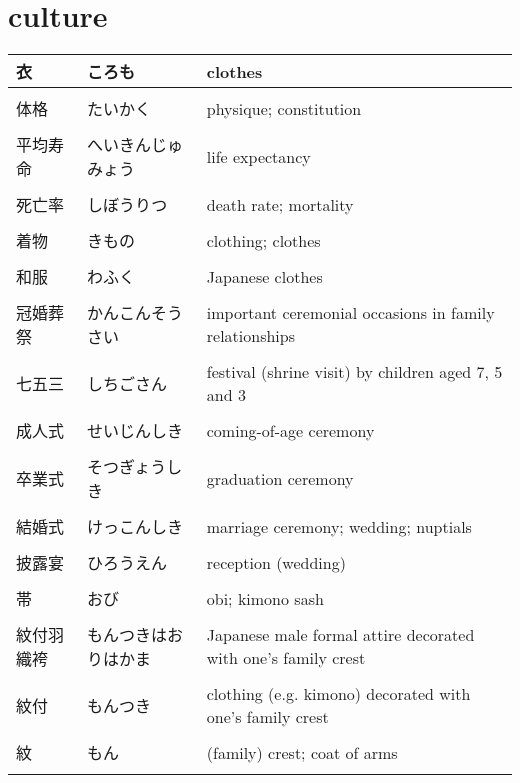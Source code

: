 \documentclass{article}
\newcommand\tabni[1][0.2cm]{\hspace*{#1}}
\begin{document}
\section{ \tabni culture }
\begin{tabular}{ l | l | p{11.5cm} }
衣 & ころも & clothes \\ \hline \\[-1em]
体格 &  たいかく  & physique; constitution \\ \hline \\[-1em]
平均寿命&  へいきんじゅみょう & life expectancy \\ \hline \\[-1em]
死亡率 &  しぼうりつ  & death rate; mortality  \\ \hline \\[-1em]
着物 &  きもの & clothing; clothes  \\ \hline \\[-1em]
和服 &  わふく & Japanese clothes \\ \hline \\[-1em]
冠婚葬祭 &  かんこんそうさい & important ceremonial occasions in family relationships \\ \hline \\[-1em]
七五三 & しちごさん & festival (shrine visit) by children aged 7, 5 and 3 \\ \hline \\[-1em]
成人式 &  せいじんしき & coming-of-age ceremony \\ \hline \\[-1em]
卒業式 & そつぎょうしき & graduation ceremony \\ \hline \\[-1em]
結婚式 &  けっこんしき & marriage ceremony; wedding; nuptials \\ \hline \\[-1em]
披露宴 &   ひろうえん  & reception (wedding) \\ \hline \\[-1em]
帯 & おび & obi; kimono sash  \\ \hline \\[-1em]
紋付羽織袴 &もんつきはおりはかま& Japanese male formal attire decorated with one's family crest \\ \hline \\[-1em]
紋付& もんつき &clothing (e.g. kimono) decorated with one's family crest \\ \hline \\[-1em]
紋&もん&(family) crest; coat of arms \\ \hline \\[-1em]

\end{tabular}
\end{document}
